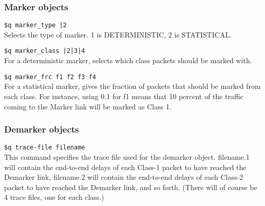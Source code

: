 \subsubsection{Marker objects}
{\tt \$q marker\_type |2\>}\\
Selects the type of marker. 1 is DETERMINISTIC, 2 is STATISTICAL. 

{\tt \$q marker\_class |2|3|4\>}\\
For a deterministic marker, selects which class packets should be marked with.

{\tt \$q marker\_frc \<f1\> \<f2\> \<f3\> \<f4\>}\\
For a statistical marker, gives the fraction of packets that should be marked 
from each class. For instance, using 0.1 for f1 means that 10 percent of the 
traffic coming to the Marker link will be marked as Class 1.

\subsubsection{Demarker objects}
{\tt \$q trace-file \<filename\>}\\
This command specifies the trace file used for the demarker object. 
filename.1 will contain the end-to-end 
delays of each Class-1 packet to have reached the 
Demarker link, filename.2 will contain the end-to-end 
delays of each Class-2 packet to have reached the 
Demarker link, and so forth. (There will of course be 4 trace files, one 
for each class.)

\endinput

### Local Variables:
### mode: latex
### comment-column: 60
### backup-by-copying-when-linked: t
### file-precious-flag: nil
### End:
